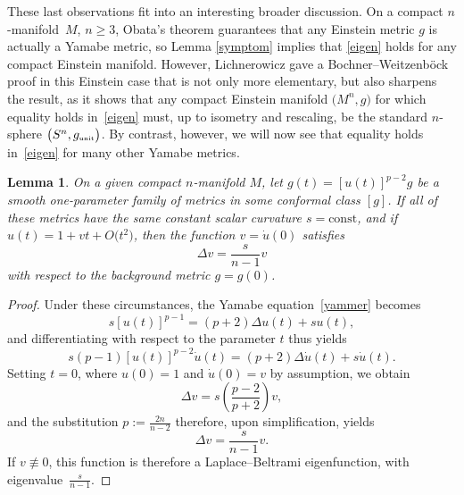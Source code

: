 \documentclass[10pt,a4paper]{amsart}
\numberwithin{equation}{section}
\newtheorem{Lemma}[Theorem]{Lemma}
\begin{document}
These last observations fit into an interesting broader discussion. On a compact $n$-mani\-fold~$M$, $n \geq 3$,
Obata's theorem guarantees that any {Einstein} metric $g$
is actually a Yamabe metric, so Lemma \ref{symptom} implies that \eqref{eigen} holds for any compact Einstein manifold. However,
 Lichnerowicz gave a Bochner--Weitzenb\"ock proof \cite{lichnebook} in this Einstein case that is not only more elementary, but also sharpens the result, as it shows that
 any compact Einstein manifold $\big(M^n,g\big)$ for which equality holds
 in~\eqref{eigen} must, up to isometry and rescaling, be the standard $n$-sphere $\big(S^n, g_{\text{\tiny unit}}\big)$.
 By contrast, however,
we will now see that equality holds in~\eqref{eigen} for many other Yamabe metrics.

\begin{Lemma} \label{plain}
On a given compact $n$-manifold $M$, let
 $g(t)= [u(t)]^{p-2}g$ be a smooth one-parameter family of metrics in some conformal class $[g]$. If all of these metrics have the same
constant scalar curvature $s= \text{const}$, and if $u(t) = 1 + vt + O\big(t^2\big)$, then the function $v= \dot{u}(0)$ satisfies
\begin{equation*}
\Delta v = \frac{s}{n-1} v
\end{equation*}
with respect to the background metric $g=g(0)$.
\end{Lemma}
\begin{proof} Under these circumstances, the
 Yamabe equation~\eqref{yammer} becomes
\begin{equation*}
s [u(t)]^{p-1} = (p+2) \Delta u(t) + su(t),
\end{equation*}
and differentiating with respect to the parameter $t$ thus yields
\begin{equation*}
s(p-1) [u(t)]^{p-2} \dot{u}(t) = (p+2)\Delta \dot{u}(t)+ s\dot{u}(t).
\end{equation*}
Setting $t=0$, where $u(0)=1$ and $\dot{u}(0)=v$ by assumption, we obtain
\begin{equation*}
\Delta v = s \left(\frac{p-2}{p+2}\right) v,
\end{equation*}
and the substitution $p :=\frac{2n}{n-2}$ therefore, upon simplification, yields
\begin{equation*}
 \Delta v = \frac{s}{n-1} v.
\end{equation*}
 If $v\not\equiv 0$, this function is therefore a Laplace--Beltrami
 eigenfunction, with eigenvalue~$\frac{s}{n-1}$.
\end{proof}
\end{document}
